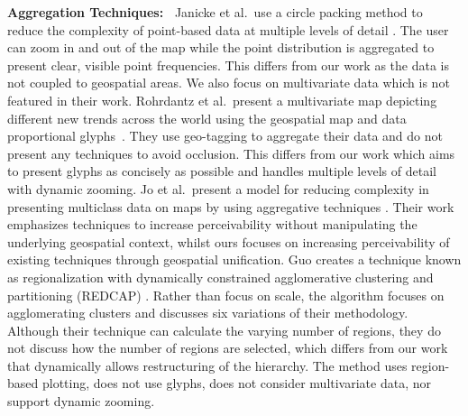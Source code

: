 \textbf{ Aggregation Techniques:~}
Janicke et al.\ use a circle packing method to reduce the complexity of point-based data at multiple levels of detail \cite{janicke2012comparative}. The user can zoom in and out of the map while the point distribution is aggregated to present clear, visible point frequencies. This differs from our work as the data is not coupled to geospatial areas. We also focus on multivariate data which is not featured in their work.
Rohrdantz et al.\ present a multivariate map depicting different new trends across the world using the geospatial map and data proportional glyphs\ \cite{rohrdantz2012s}. They use geo-tagging to aggregate their data and do not present any techniques to avoid occlusion. This differs from our work which aims to present glyphs as concisely as possible and handles multiple levels of detail with dynamic zooming. 
Jo et al.\ present a model for reducing complexity in presenting multiclass data on maps by using aggregative techniques \cite{jo2019declarative}. Their work emphasizes techniques to increase perceivability without manipulating the underlying geospatial context, whilst ours focuses on increasing perceivability of existing techniques through geospatial unification.
Guo creates a technique known as regionalization with dynamically constrained agglomerative clustering and partitioning (REDCAP) \cite{guo2008regionalization}. Rather than focus on scale, the algorithm focuses on agglomerating clusters and discusses six variations of their methodology. Although their technique can calculate the varying number of regions, they do not discuss how the number of regions are selected, which differs from our work that dynamically allows restructuring of the hierarchy. The method uses region-based plotting, does not use glyphs, does not consider multivariate data, nor support dynamic zooming.

